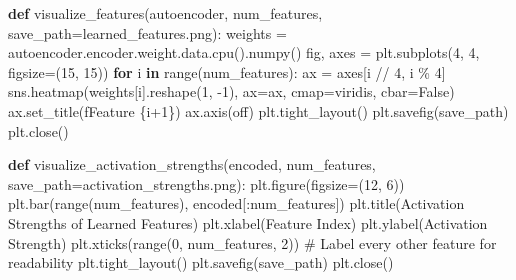 \documentclass[
  letterpaper,
  DIV=11,
  numbers=noendperiod]{scrreprt}
\newenvironment{Shaded}{\begin{snugshade}}{\end{snugshade}}
\newcommand{\BuiltInTok}[1]{\textcolor[rgb]{0.00,0.23,0.31}{#1}}
\newcommand{\CommentTok}[1]{\textcolor[rgb]{0.37,0.37,0.37}{#1}}
\newcommand{\ControlFlowTok}[1]{\textcolor[rgb]{0.00,0.23,0.31}{\textbf{#1}}}
\newcommand{\DecValTok}[1]{\textcolor[rgb]{0.68,0.00,0.00}{#1}}
\newcommand{\KeywordTok}[1]{\textcolor[rgb]{0.00,0.23,0.31}{\textbf{#1}}}
\newcommand{\NormalTok}[1]{\textcolor[rgb]{0.00,0.23,0.31}{#1}}
\newcommand{\OperatorTok}[1]{\textcolor[rgb]{0.37,0.37,0.37}{#1}}
\newcommand{\SpecialCharTok}[1]{\textcolor[rgb]{0.37,0.37,0.37}{#1}}
\newcommand{\SpecialStringTok}[1]{\textcolor[rgb]{0.13,0.47,0.30}{#1}}
\newcommand{\StringTok}[1]{\textcolor[rgb]{0.13,0.47,0.30}{#1}}
\newcommand{\VariableTok}[1]{\textcolor[rgb]{0.07,0.07,0.07}{#1}}
\begin{document}
\begin{Shaded}
\begin{Highlighting}[]
\KeywordTok{def}\NormalTok{ visualize\_features(autoencoder, num\_features, save\_path}\OperatorTok{=}\StringTok{\textquotesingle{}learned\_features.png\textquotesingle{}}\NormalTok{):}
\NormalTok{    weights }\OperatorTok{=}\NormalTok{ autoencoder.encoder.weight.data.cpu().numpy()}
\NormalTok{    fig, axes }\OperatorTok{=}\NormalTok{ plt.subplots(}\DecValTok{4}\NormalTok{, }\DecValTok{4}\NormalTok{, figsize}\OperatorTok{=}\NormalTok{(}\DecValTok{15}\NormalTok{, }\DecValTok{15}\NormalTok{))}
    \ControlFlowTok{for}\NormalTok{ i }\KeywordTok{in} \BuiltInTok{range}\NormalTok{(num\_features):}
\NormalTok{        ax }\OperatorTok{=}\NormalTok{ axes[i }\OperatorTok{//} \DecValTok{4}\NormalTok{, i }\OperatorTok{\%} \DecValTok{4}\NormalTok{]}
\NormalTok{        sns.heatmap(weights[i].reshape(}\DecValTok{1}\NormalTok{, }\OperatorTok{{-}}\DecValTok{1}\NormalTok{), ax}\OperatorTok{=}\NormalTok{ax, cmap}\OperatorTok{=}\StringTok{\textquotesingle{}viridis\textquotesingle{}}\NormalTok{, cbar}\OperatorTok{=}\VariableTok{False}\NormalTok{)}
\NormalTok{        ax.set\_title(}\SpecialStringTok{f\textquotesingle{}Feature }\SpecialCharTok{\{}\NormalTok{i}\OperatorTok{+}\DecValTok{1}\SpecialCharTok{\}}\SpecialStringTok{\textquotesingle{}}\NormalTok{)}
\NormalTok{        ax.axis(}\StringTok{\textquotesingle{}off\textquotesingle{}}\NormalTok{)}
\NormalTok{    plt.tight\_layout()}
\NormalTok{    plt.savefig(save\_path)}
\NormalTok{    plt.close()}

\KeywordTok{def}\NormalTok{ visualize\_activation\_strengths(encoded, num\_features, save\_path}\OperatorTok{=}\StringTok{\textquotesingle{}activation\_strengths.png\textquotesingle{}}\NormalTok{):}
\NormalTok{    plt.figure(figsize}\OperatorTok{=}\NormalTok{(}\DecValTok{12}\NormalTok{, }\DecValTok{6}\NormalTok{))}
\NormalTok{    plt.bar(}\BuiltInTok{range}\NormalTok{(num\_features), encoded[:num\_features])}
\NormalTok{    plt.title(}\StringTok{\textquotesingle{}Activation Strengths of Learned Features\textquotesingle{}}\NormalTok{)}
\NormalTok{    plt.xlabel(}\StringTok{\textquotesingle{}Feature Index\textquotesingle{}}\NormalTok{)}
\NormalTok{    plt.ylabel(}\StringTok{\textquotesingle{}Activation Strength\textquotesingle{}}\NormalTok{)}
\NormalTok{    plt.xticks(}\BuiltInTok{range}\NormalTok{(}\DecValTok{0}\NormalTok{, num\_features, }\DecValTok{2}\NormalTok{))  }\CommentTok{\# Label every other feature for readability}
\NormalTok{    plt.tight\_layout()}
\NormalTok{    plt.savefig(save\_path)}
\NormalTok{    plt.close()}


\end{Highlighting}
\end{Shaded}
\end{document}

